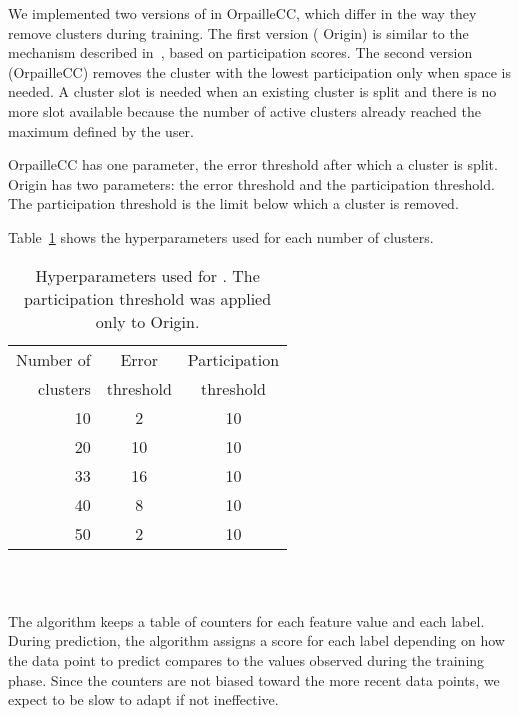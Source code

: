 We implemented two versions of \mcnn in
OrpailleCC, which differ in the way they remove
clusters during training. The first version (\mcnn
Origin) is similar to the mechanism described
in~\cite{mc-nn}, based on participation scores.
The second version (\mcnn OrpailleCC)
removes the cluster with the lowest participation
only when space is needed.  A cluster slot is
needed when an existing cluster is split and there
is no more slot available because the number of
active clusters already reached the maximum defined
by the user.

\mcnn OrpailleCC has one
parameter, the error threshold after which a
cluster is split.  \mcnn Origin has two
parameters: the error threshold and the
participation threshold. The participation
threshold is the limit below which a cluster is
removed.

Table~\ref{table:hyperparameter-mcnn} shows
the hyperparameters used for each number of
clusters. 
\begin{table}
		\begin{center}
			\begin{tabular}{|| r | c | c ||} 
				\hline
					Number of &  Error & Participation\\ [0.5ex] 
					clusters & threshold & threshold\\[0.5ex]
				\hline\hline
					10 & 2 & 10\\
					20 & 10 & 10\\
					33 & 16 & 10\\
					40 & 8 & 10\\
					50 & 2 & 10\\
				\hline
			\end{tabular}
		\end{center}
		\caption{Hyperparameters used for \mcnn. The
		participation threshold was applied only to
		\mcnn Origin.}
		\label{table:hyperparameter-mcnn}
\end{table}

\subsubsection{\naivebayes~\cite{naive_bayes}}
The \naivebayes algorithm keeps a table of
counters for each feature value and each label.
During prediction, the algorithm assigns a
score for each label depending on how the data
point to predict compares to the values observed
during the training phase. Since the counters are
not biased toward the more recent data points, we
expect \naivebayes to be slow to adapt if not
ineffective.

